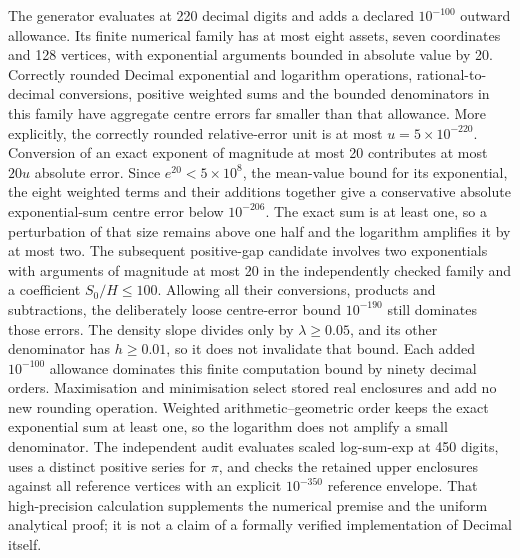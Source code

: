 The generator evaluates at 220 decimal digits and adds a declared
\(10^{-100}\) outward allowance. Its finite numerical family has at
most eight assets, seven coordinates and 128 vertices, with exponential
arguments bounded in absolute value by 20. Correctly rounded Decimal
exponential and logarithm operations, rational-to-decimal conversions,
positive weighted sums and the bounded denominators in this family have
aggregate centre errors far smaller than that allowance. More explicitly,
the correctly rounded relative-error unit is at most
\(u=5\times10^{-220}\). Conversion of an exact exponent of magnitude
at most 20 contributes at most \(20u\) absolute error. Since
\(e^{20}<5\times10^8\), the mean-value bound for its exponential,
the eight weighted terms and their additions together give a conservative
absolute exponential-sum centre error below \(10^{-206}\).
The exact sum is at least one, so a perturbation of that size remains above
one half and the logarithm amplifies it by at most two. The subsequent
positive-gap candidate involves two exponentials with arguments of magnitude
at most 20 in the independently checked family and a coefficient
\(S_0/H\leq100\). Allowing all their conversions, products and
subtractions, the deliberately loose centre-error bound \(10^{-190}\)
still dominates those errors. The density slope divides only by
\(\lambda\geq0.05\), and its other denominator has \(h\geq0.01\),
so it does not invalidate that bound. Each added \(10^{-100}\)
allowance dominates this finite computation bound by ninety decimal orders.
Maximisation and minimisation select stored real enclosures and add no
new rounding operation. Weighted
arithmetic--geometric order keeps the exact exponential sum at least one,
so the logarithm does not amplify a small denominator. The independent
audit evaluates scaled log-sum-exp at 450 digits, uses a distinct positive
series for \(\pi\), and checks the retained upper enclosures against
all reference vertices with an explicit \(10^{-350}\) reference envelope.
That high-precision calculation supplements the numerical premise and
the uniform analytical proof; it is not a claim of a formally verified
implementation of Decimal itself.

